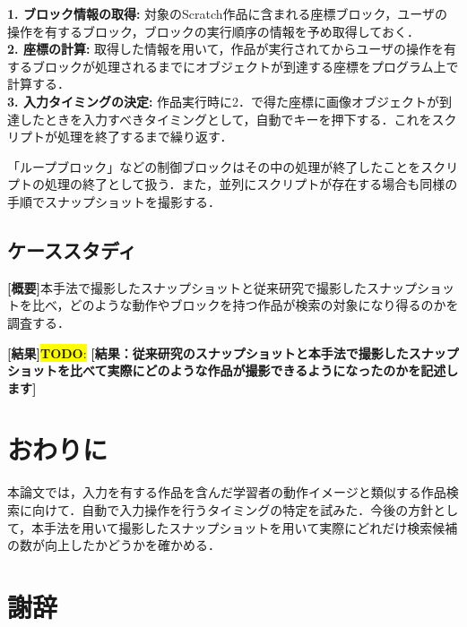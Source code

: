 \documentclass[uplatex,dvipdfmx,a4paper,twocolumn,base=11pt,jbase=11pt,ja=standard]{bxjsarticle}  %
\newcommand{\todo}[1]{\colorbox{yellow}{{\bf TODO}:}{\color{red} {\textbf{[#1]}}}}
\begin{document}
\noindent\textbf{1. ブロック情報の取得: }対象のScratch作品に含まれる座標ブロック，ユーザの操作を有するブロック，ブロックの実行順序の情報を予め取得しておく．\\
\noindent\textbf{2. 座標の計算: }取得した情報を用いて，作品が実行されてからユーザの操作を有するブロックが処理されるまでにオブジェクトが到達する座標をプログラム上で計算する．\\
\noindent\textbf{3. 入力タイミングの決定: }作品実行時に2．で得た座標に画像オブジェクトが到達したときを入力すべきタイミングとして，自動でキーを押下する．これをスクリプトが処理を終了するまで繰り返す．

「ループブロック」などの制御ブロックはその中の処理が終了したことをスクリプトの処理の終了として扱う．また，並列にスクリプトが存在する場合も同様の手順でスナップショットを撮影する．

\subsection{ケーススタディ}

\noindent\textbf{[概要]}本手法で撮影したスナップショットと従来研究で撮影したスナップショットを比べ，どのような動作やブロックを持つ作品が検索の対象になり得るのかを調査する．

\noindent\textbf{[結果]}\todo{結果：従来研究のスナップショットと本手法で撮影したスナップショットを比べて実際にどのような作品が撮影できるようになったのかを記述します}

%


\section{おわりに}

本論文では，入力を有する作品を含んだ学習者の動作イメージと類似する作品検索に向けて．自動で入力操作を行うタイミングの特定を試みた．今後の方針として，本手法を用いて撮影したスナップショットを用いて実際にどれだけ検索候補の数が向上したかどうかを確かめる．

\section*{謝辞}
\end{document}
